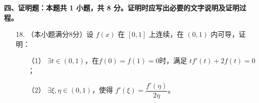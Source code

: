 \documentclass[a4paper,12pt]{article}
\begin{document}
\noindent
\textbf{四、证明题：本题共 1 小题，共 8 分。证明时应写出必要的文字说明及证明过程。}

\begin{enumerate}
    \item[18.]（本小题满分8分）设 \( f(x) \) 在 \( [0, 1] \) 上连续，在 \( (0, 1) \) 内可导，证明：

    \begin{enumerate}
        \item[（1）]\(\exists t \in (0, 1) \)，在\( f(0) = f(1) = 0\)时，满足 \( tf'(t)+2f(t) = 0 \)；
        \item[（2）]\(\exists \xi, \eta \in (0, 1) \)，使得 \( f'(\xi) = \dfrac{f'(\eta)}{2\eta}  \)。
    \end{enumerate}
\end{enumerate}
\end{document}
